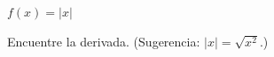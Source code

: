 \setcounter{enumi}{78}
\item $f(x) = |x|$
\par
Encuentre la derivada. (Sugerencia: $|x| = \sqrt{x^2}$.)

